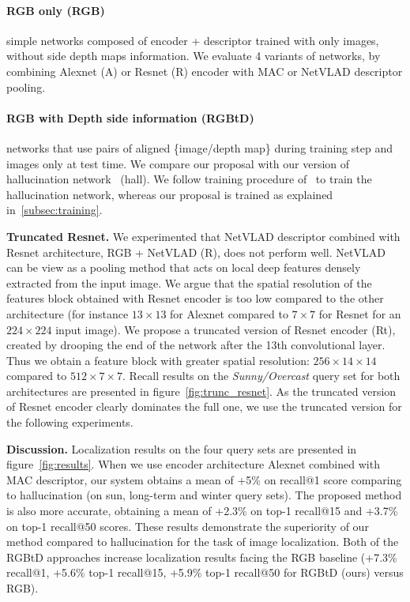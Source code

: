    \paragraph{RGB only (\textbf{RGB})} simple networks composed of encoder + descriptor trained with only images, without side depth maps information. We evaluate 4 variants of networks, by combining Alexnet (A) or Resnet (R) encoder with MAC or NetVLAD descriptor pooling.
    \paragraph{RGB with Depth side information (\textbf{RGBtD})} networks that use pairs of aligned \{image/depth map\} during training step and images only at test time. We compare our proposal with our version of hallucination network~\cite{Hoffman2016} (hall). We follow training procedure of~\cite{Hoffman2016} to train the hallucination network, whereas our proposal is trained as explained in~\ref{subsec:training}. 

\vspace{4pt}\noindent\textbf{Truncated Resnet.} We experimented that NetVLAD descriptor combined with Resnet architecture, RGB + NetVLAD (R), does not perform well. NetVLAD can be view as a pooling method that acts on local deep features densely extracted from the input image. We argue that the spatial resolution of the features block obtained with Resnet encoder is too low compared to the other architecture (for instance $13\times13$ for Alexnet compared to $7\times7$ for Resnet for an $224\times224$ input image). We propose a truncated version of Resnet encoder (Rt), created by drooping the end of the network after the 13th convolutional layer. Thus we obtain a feature block with greater spatial resolution: $256\times14\times14$ compared to $512\times7\times7$. Recall results on the \textit{Sunny/Overcast} query set for both architectures are presented in figure~\ref{fig:trunc_resnet}. As the truncated version of Resnet encoder clearly dominates the full one, we use the truncated version for the following experiments.

\vspace{4pt}\noindent\textbf{Discussion.} Localization results on the four query sets are presented in figure~\ref{fig:results}.  When we use encoder architecture Alexnet combined with MAC descriptor, our system obtains a mean of +5\% on recall@1 score comparing to hallucination (on sun, long-term and winter query sets). The proposed method is also more accurate, obtaining a mean of +2.3\% on top-1 recall@15 and +3.7\% on top-1 recall@50 scores. These results demonstrate the superiority of our method compared to hallucination for the task of image localization. Both of the RGBtD approaches increase localization results facing the RGB baseline (+7.3\% recall@1, +5.6\% top-1 recall@15, +5.9\% top-1 recall@50 for RGBtD (ours) versus RGB).

